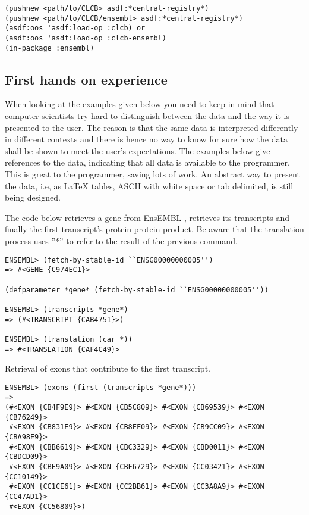 \documentclass{book}
\newcommand\ensembl{EnsEMBL }
\begin{document}
\lstset{language=lisp}
\begin{lstlisting}
(pushnew <path/to/CLCB> asdf:*central-registry*)
(pushnew <path/to/CLCB/ensembl> asdf:*central-registry*)
(asdf:oos 'asdf:load-op :clcb) or
(asdf:oos 'asdf:load-op :clcb-ensembl)
(in-package :ensembl)
\end{lstlisting}

\subsection{First hands on experience}

When looking at the examples given below you need to keep in mind that
computer scientists try hard to distinguish between the data and the
way it is presented to the user. The reason is that the same data
is interpreted differently in different contexts and there is hence
no way to know for sure how the data shall be shown to meet the user's
expectations. The examples below give references to the data, indicating
that all data is available to the programmer. This is great to the
programmer, saving lots of work. An abstract way to present the data,
i.e, as LaTeX tables, ASCII with white space or tab delimited, is still
being designed.

The code below retrieves a gene from \ensembl, retrieves its transcripts and finally the first transcript's protein protein product. Be aware that the translation process uses ''*'' to refer to the result of the previous command.

\begin{lstlisting}
ENSEMBL> (fetch-by-stable-id ``ENSG00000000005'')
=> #<GENE {C974EC1}>

(defparameter *gene* (fetch-by-stable-id ``ENSG00000000005''))

ENSEMBL> (transcripts *gene*)
=> (#<TRANSCRIPT {CAB4751}>)

ENSEMBL> (translation (car *))
=> #<TRANSLATION {CAF4C49}>
\end{lstlisting}

Retrieval of exons that contribute to the first transcript.
\begin{lstlisting}
ENSEMBL> (exons (first (transcripts *gene*)))
=> 
(#<EXON {CB4F9E9}> #<EXON {CB5C809}> #<EXON {CB69539}> #<EXON {CB76249}>
 #<EXON {CB831E9}> #<EXON {CB8FF09}> #<EXON {CB9CC09}> #<EXON {CBA98E9}>
 #<EXON {CBB6619}> #<EXON {CBC3329}> #<EXON {CBD0011}> #<EXON {CBDCD09}>
 #<EXON {CBE9A09}> #<EXON {CBF6729}> #<EXON {CC03421}> #<EXON {CC10149}>
 #<EXON {CC1CE61}> #<EXON {CC2BB61}> #<EXON {CC3A8A9}> #<EXON {CC47AD1}>
 #<EXON {CC56809}>)
\end{lstlisting}
\end{document}
